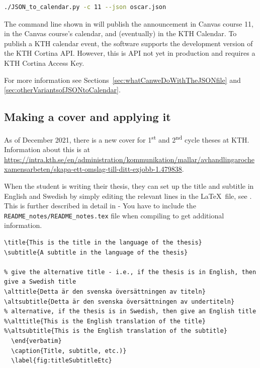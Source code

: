 \begin{lstlisting}[language={bash}, caption={JSON\_to\_calendar.py for Oscar}, label=lst:jsonToCalenarforOscar1] 
./JSON_to_calendar.py -c 11 --json oscar.json
\end{lstlisting}
The command line shown in  will publish the announcement in \first Canvas course 11, \Second in the Canvas course’s calendar, and \third (eventually) in the KTH Calendar. To publish a KTH calendar event, the software supports the development version of the KTH Cortina API. However, this is API not yet in production and requires a KTH Cortina Access Key.

 For more information see Sections~\ref{sec:whatCanweDoWithTheJSONfile} and \ref{sec:otherVariantsofJSONtoCalendar}.

\subsection{Making a cover and applying it}
\label{sec:makingACover}
As of December 2021, there is a new cover for 1\textsuperscript{st} and 2\textsuperscript{nd} cycle theses at KTH. Information about this is at \url{https://intra.kth.se/en/administration/kommunikation/mallar/avhandlingarochexamensarbeten/skapa-ett-omslag-till-ditt-exjobb-1.479838}.

When the student is writing their thesis, they can set up the title and subtitle in English and Swedish by simply editing the relevant lines in the \LaTeX~file, see . This is further described in detail in   
{- You have to include the \texttt{README\_notes/README\_notes.tex} file when compiling to get additional information.}

\begin{lstlisting}[language={[LaTeX]TeX}, caption={Title and subtitle in the two languages}, label=lst:titleSubtitleEtc] 
\title{This is the title in the language of the thesis}
\subtitle{A subtitle in the language of the thesis}

% give the alternative title - i.e., if the thesis is in English, then give a Swedish title
\alttitle{Detta är den svenska översättningen av titeln}
\altsubtitle{Detta är den svenska översättningen av undertiteln}
% alternative, if the thesis is in Swedish, then give an English title
%\alttitle{This is the English translation of the title}
%\altsubtitle{This is the English translation of the subtitle}
  \end{verbatim}
  \caption{Title, subtitle, etc.)}
  \label{fig:titleSubtitleEtc}
\end{lstlisting}

